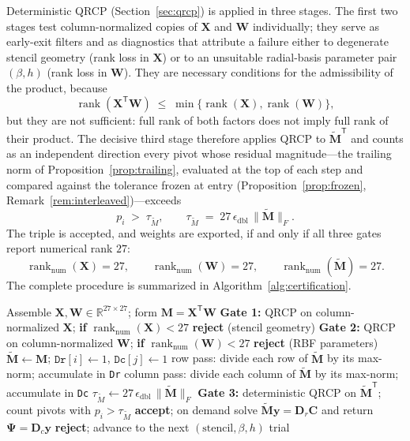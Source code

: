 \documentclass[11pt,a4paper]{article}
\theoremstyle{definition}
\newcommand{\R}{\mathbb{R}}
\newcommand{\eps}{\epsilon_{\mathrm{dbl}}}
\newcommand{\Mt}{\widetilde{\bm M}}
\newcommand{\normF}[1]{\|#1\|_{F}}
\newcommand{\rankn}{\operatorname{rank}_{\mathrm{num}}}
\begin{document}
Deterministic QRCP (Section~\ref{sec:qrcp}) is applied in three
stages. The first two stages test column-normalized copies of $\bm X$
and $\bm W$ individually; they serve as early-exit filters and as
diagnostics that attribute a failure either to degenerate stencil
geometry (rank loss in $\bm X$) or to an unsuitable
radial-basis parameter pair $(\beta,h)$ (rank loss in $\bm W$).
They are necessary conditions for the admissibility of the product,
because
\begin{equation}
  \operatorname{rank}(\bm X^{\mathsf T}\bm W)
  \;\le\;
  \min\{\operatorname{rank}(\bm X),\operatorname{rank}(\bm W)\},
\end{equation}
but they are not sufficient: full rank of both factors does not imply
full rank of their product. The decisive third stage therefore
applies QRCP to $\Mt^{\mathsf T}$ and counts as an independent
direction every pivot whose residual magnitude---the trailing norm
of Proposition~\ref{prop:trailing}, evaluated at the top of each step
and compared against the tolerance frozen at entry
(Proposition~\ref{prop:frozen}, Remark~\ref{rem:interleaved})---exceeds
\begin{equation}
  \boxed{\;
  p_i \;>\; \tau_{\widetilde M},
  \qquad
  \tau_{\widetilde M}\;=\;27\,\eps\,\normF{\Mt}.
  \;}
  \label{eq:threshold}
\end{equation}
The triple is accepted, and weights are exported, if and only if all
three gates report numerical rank $27$:
\begin{equation}
  \rankn(\bm X)=27,\qquad
  \rankn(\bm W)=27,\qquad
  \rankn(\Mt)=27.
\end{equation}
The complete procedure is summarized in
Algorithm~\ref{alg:certification}.

\begin{algorithm}[t]
\caption{Numerical rank certification of a candidate triple
$(\text{stencil},\beta,h)$}
\label{alg:certification}
\begin{algorithmic}[1]
\State Assemble $\bm X,\bm W\in\R^{27\times27}$;
       form $\bm M=\bm X^{\mathsf T}\bm W$
\State \textbf{Gate 1:} QRCP on column-normalized $\bm X$;
       \textbf{if} $\rankn(\bm X)<27$ \textbf{reject} (stencil geometry)
\State \textbf{Gate 2:} QRCP on column-normalized $\bm W$;
       \textbf{if} $\rankn(\bm W)<27$ \textbf{reject} (RBF parameters)
\State $\Mt\leftarrow\bm M$;\quad
       $\texttt{Dr}[i]\leftarrow1$, $\texttt{Dc}[j]\leftarrow1$
 
  \State row pass: divide each row of $\Mt$ by its max-norm;
         accumulate in \texttt{Dr}
  \State column pass: divide each column of $\Mt$ by its max-norm;
         accumulate in \texttt{Dc}
\EndFor
\State $\tau_{\widetilde M}\leftarrow27\,\eps\,\normF{\Mt}$
\State \textbf{Gate 3:} deterministic QRCP on $\Mt^{\mathsf T}$;
       count pivots with $p_i>\tau_{\widetilde M}$
  \State \textbf{accept}; on demand solve
         $\Mt\bm y=\bm D_r\bm C$ and return
         $\bm\Psi=\bm D_c\bm y$
\Else
  \State \textbf{reject}; advance to the next
         $(\text{stencil},\beta,h)$ trial
\EndIf
\end{algorithmic}
\end{algorithm}
\end{document}
